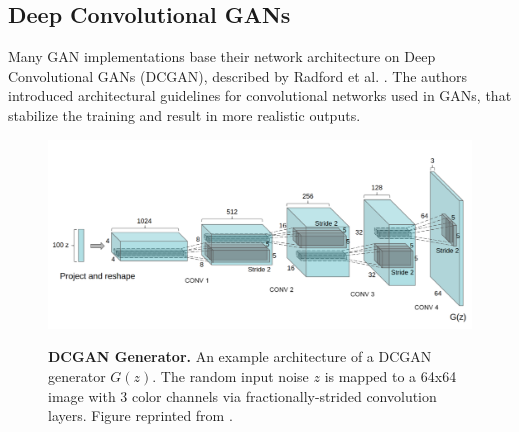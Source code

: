 \documentclass[12pt]{report}
\begin{document}
\subsection{Deep Convolutional GANs} \label{sec:dcgan}


Many GAN implementations base their network architecture on Deep Convolutional GANs (DCGAN), described by Radford et al. \cite{radford_unsupervised_2015}. The authors introduced architectural guidelines for convolutional networks used in GANs, that stabilize the training and result in more realistic outputs.

\begin{figure}[h]
\centering
{\includegraphics[width=\linewidth]{02_background/dcgan_generator}}
\caption{\label{fig:dcgan} \textbf{DCGAN Generator.} An example architecture of a DCGAN generator $G(z)$. The random input noise $z$ is mapped to a 64x64 image with 3 color channels via fractionally-strided convolution layers. Figure reprinted from \cite{radford_unsupervised_2015}.}
\end{figure}
\end{document}
